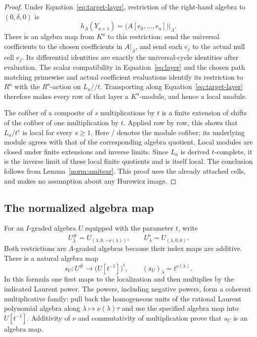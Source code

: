 \begin{proof}
Under Equation~\eqref{eq:target-layer}, restriction of the right-hand
algebra to $(0,\delta,0)$ is
\[
 h_\Lambda(Y_{a+1})
   =\bigl(A[e_0,\ldots,e_a]\bigr)|_\Lambda.
\]
There is an algebra map from $K^a$ to this restriction: send the
universal coefficients to the chosen coefficients in $A|_\Lambda$,
and send each $e_j$ to the actual null cell $e_j$.  Its differential
identities are exactly the universal-cycle identities after
evaluation.  The scalar compatibility in
Equation~\eqref{eq:layer} and the chosen path matching primewise and
actual coefficient evaluations identify its restriction to $R^a$
with the $R^a$-action on $L_a//t$.  Transporting along
Equation~\eqref{eq:target-layer} therefore makes every row of that
layer a $K^a$-module, and hence a local module.

The cofiber of a composite of $s$ multiplications by $t$ is a finite
extension of shifts of the cofiber of one multiplication by $t$.
Applied row by row, this shows that $L_a/t^s$ is local for every
$s\geq1$.  Here $/$ denotes the module cofiber; its underlying
module agrees with that of the corresponding algebra quotient.
Local modules are closed under finite extensions and inverse limits.
Since $L_a$ is derived $t$-complete, it is the inverse limit of these
local finite quotients and is itself local.  The conclusion follows
from Lemma~\ref{norm:amitsur}.  This proof uses the already attached
cells, and makes no assumption about any Hurewicz image.
\end{proof}

\subsection{The normalized algebra map}

For an $I$-graded algebra $U$ equipped with the parameter $t$, write
\[
 U^\#_\lambda=U_{(\lambda,0,-\nu(\lambda))},
 \qquad
 U^\flat_\lambda=U_{(\lambda,0,0)}.
\]
Both restrictions are $\Lambda$-graded algebras because their index
maps are additive.  There is a natural algebra map
\begin{equation}
\label{norm:regrading-map}
 s_U:U^\#\longrightarrow\bigl(U[t^{-1}]\bigr)^\flat,
 \qquad (s_U)_\lambda=t^{\nu(\lambda)}.
\end{equation}
In this formula one first maps to the localization and then
multiplies by the indicated Laurent power.  The powers, including
negative powers, form a coherent multiplicative family: pull back
the homogeneous units of the rational Laurent polynomial algebra
along $\lambda\mapsto\nu(\lambda)\tau$ and use the specified
algebra map into $U[t^{-1}]$.  Additivity of $\nu$ and
commutativity of multiplication prove that $s_U$ is an algebra map.

